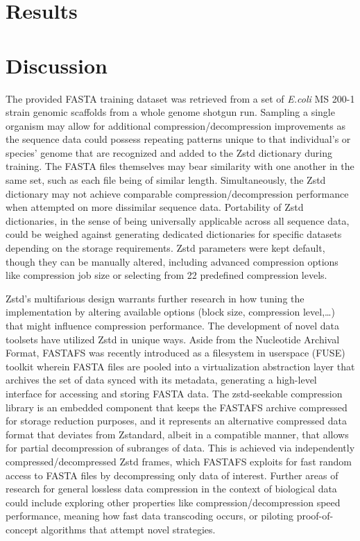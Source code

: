 \documentclass[
  10pt,
  letterpaper,
]{article}
\begin{document}
\hypertarget{results}{%
\section{Results}\label{results}}

\hypertarget{discussion}{%
\section{Discussion}\label{discussion}}

The provided FASTA training dataset was retrieved from a set of
\textit{E.coli} MS 200-1 strain genomic scaffolds from a whole genome
shotgun run\citep{ncbi}. Sampling a single organism may allow for
additional compression/decompression improvements as the sequence data
could possess repeating patterns unique to that individual's or species'
genome that are recognized and added to the Zstd dictionary during
training. The FASTA files themselves may bear similarity with one
another in the same set, such as each file being of similar length.
Simultaneously, the Zstd dictionary may not achieve comparable
compression/decompression performance when attempted on more dissimilar
sequence data. Portability of Zstd dictionaries, in the sense of being
universally applicable across all sequence data, could be weighed
against generating dedicated dictionaries for specific datasets
depending on the storage requirements. Zstd parameters were kept
default, though they can be manually altered, including advanced
compression options like compression job size or selecting from 22
predefined compression levels\citep{facebook}.

Zstd's multifarious design warrants further research in how tuning the
implementation by altering available options (block size, compression
level,\ldots) that might influence compression performance. The
development of novel data toolsets have utilized Zstd in unique ways.
Aside from the Nucleotide Archival Format, FASTAFS was recently
introduced as a filesystem in userspace (FUSE) toolkit wherein FASTA
files are pooled into a virtualization abstraction layer that archives
the set of data synced with its metadata, generating a high-level
interface for accessing and storing FASTA data\citep{fastafs}. The
zstd-seekable compression library is an embedded component that keeps
the FASTAFS archive compressed for storage reduction purposes, and it
represents an alternative compressed data format that deviates from
Zstandard, albeit in a compatible manner, that allows for partial
decompression of subranges of data\citep{facebook}. This is achieved via
independently compressed/decompressed Zstd frames, which FASTAFS
exploits for fast random access to FASTA files by decompressing only
data of interest. Further areas of research for general lossless data
compression in the context of biological data could include exploring
other properties like compression/decompression speed performance,
meaning how fast data transcoding occurs, or piloting proof-of-concept
algorithms that attempt novel strategies.
\end{document}
